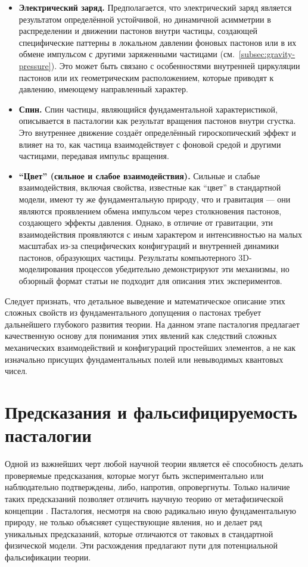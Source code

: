 \documentclass[pdflatex,sn-mathphys-num]{sn-jnl}
\begin{document}
\begin{itemize}
    \item \textbf{Электрический заряд.} Предполагается, что электрический заряд является результатом определённой устойчивой, но динамичной асимметрии в распределении и движении пастонов внутри частицы, создающей специфические паттерны в локальном давлении фоновых пастонов или в их обмене импульсом с другими заряженными частицами (см.~\ref{subsec:gravity-pressure}). Это может быть связано с особенностями внутренней циркуляции пастонов или их геометрическим расположением, которые приводят к давлению, имеющему направленный характер.
    \item \textbf{Спин.} Спин частицы, являющийся фундаментальной характеристикой, описывается в пасталогии как результат вращения пастонов внутри сгустка. Это внутреннее движение создаёт определённый гироскопический эффект и влияет на то, как частица взаимодействует с фоновой средой и другими частицами, передавая импульс вращения.
    \item \textbf{``Цвет'' (сильное и слабое взаимодействия).} Сильные и слабые взаимодействия, включая свойства, известные как ``цвет'' в стандартной модели, имеют ту же фундаментальную природу, что и гравитация --- они являются проявлением обмена импульсом через столкновения пастонов, создающего эффекты давления. Однако, в отличие от гравитации, эти взаимодействия проявляются с иным характером и интенсивностью на малых масштабах из-за специфических конфигураций и внутренней динамики пастонов, образующих частицы. Результаты компьютерного 3D-моделирования процессов убедительно демонстрируют эти механизмы, но обзорный формат статьи не подходит для описания этих экспериментов.
\end{itemize}

Следует признать, что детальное выведение и математическое описание этих сложных свойств из фундаментального допущения о пастонах требует дальнейшего глубокого развития теории. На данном этапе пасталогия предлагает качественную основу для понимания этих явлений как следствий сложных механических взаимодействий и конфигураций простейших элементов, а не как изначально присущих фундаментальных полей или невыводимых квантовых чисел.

\section{Предсказания и фальсифицируемость пасталогии}\label{sec:predictions}

Одной из важнейших черт любой научной теории является её способность делать проверяемые предсказания, которые могут быть экспериментально или наблюдательно подтверждены, либо, напротив, опровергнуты. Только наличие таких предсказаний позволяет отличить научную теорию от метафизической концепции \cite{popper1959}. Пасталогия, несмотря на свою радикально иную фундаментальную природу, не только объясняет существующие явления, но и делает ряд уникальных предсказаний, которые отличаются от таковых в стандартной физической модели. Эти расхождения предлагают пути для потенциальной фальсификации теории.
\end{document}
